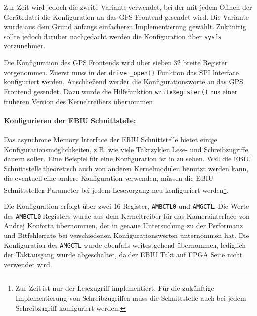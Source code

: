 Zur Zeit wird jedoch die zweite Variante verwendet, bei der mit jedem Öffnen der Gerätedatei die Konfiguration an das GPS Frontend gesendet wird. Die Variante wurde aus dem Grund anfangs einfacheren Implementierung gewählt. Zukünftig sollte jedoch darüber nachgedacht werden die Konfiguration über \lstinline$sysfs$ vorzunehmen.

Die Konfiguration des GPS Frontends wird über sieben \SI{32}{\bit} breite Register vorgenommen. Zuerst muss in der \lstinline[language=C]$driver_open()$ Funktion das SPI Interface konfiguriert werden. Anschließend werden die Konfigurationsworte an das GPS Frontend gesendet. Dazu wurde die Hilfsfunktion \lstinline$writeRegister()$ aus einer früheren Version des Kerneltreibers übernommen.


\paragraph{Konfigurieren der EBIU Schnittstelle:}
Das asynchrone Memory Interface der EBIU Schnittstelle bietet einige Konfigurationsmöglichkeiten, z.B. wie viele Taktzyklen Lese- und Schreibzugriffe dauern sollen. Eine Beispiel für eine Konfiguration ist in  zu sehen. Weil die EBIU Schnittstelle theoretisch auch von anderen Kernelmodulen benutzt werden kann, die eventuell eine andere Konfiguration verwenden, müssen die EBIU Schnittstellen Parameter bei jedem Lesevorgang neu konfiguriert werden\footnote{Zur Zeit ist nur der Lesezugriff implementiert. Für die zukünftige Implementierung von Schreibzugriffen muss die Schnittstelle auch bei jedem Schreibzugriff konfiguriert werden.}. 

Die Konfiguration erfolgt über zwei \SI{16}{\bit} Register, \lstinline$AMBCTL0$ und \lstinline$AMGCTL$. Die Werte des \lstinline$AMBCTL0$ Registers wurde aus dem Kerneltreiber für das Kamerainterface von Andrej Konforta übernommen, der in \cite{DragsailAndrejMA} genaue Untersuchung zu der Performanz und Bitfehlerrate bei verschiedenen Konfigurationswerten unternommen hat. Die Konfiguration des \lstinline$AMGCTL$ wurde ebenfalls weitestgehend übernommen, lediglich der Taktausgang wurde abgeschaltet, da der EBIU Takt auf FPGA Seite nicht verwendet wird.



